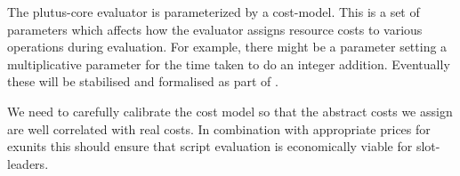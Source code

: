 The \gls{plutus-core} evaluator is parameterized by a \gls{cost-model}.
This is a set of parameters which affects how the evaluator assigns resource costs to various operations during evaluation.
For example, there might be a parameter setting a multiplicative parameter for the time taken to do an integer addition.
Eventually these will be stabilised and formalised as part of \textcite{plutus-core-spec}.

We need to carefully calibrate the cost model so that the abstract costs we assign are well correlated with real costs.
In combination with appropriate prices for \gls{exunits} this should ensure that script evaluation is economically viable for \glspl{slot-leader}.
